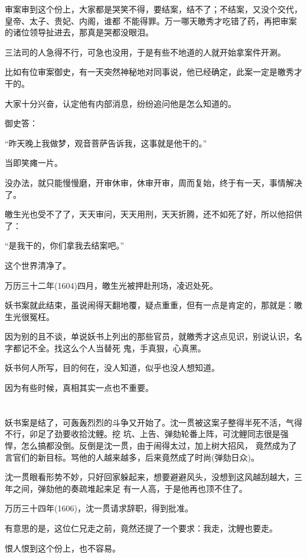 \documentclass[11pt,a4paper,onecolumn]{article}
\begin{document}
审案审到这个份上，大家都是哭笑不得，要结案，结不了；不结案，又没个交代，皇帝、太子、贵妃、内阁，谁都
不能得罪。万一哪天皦秀才吃错了药，再把审案的诸位领导扯进去，那真是哭都没眼泪。

三法司的人急得不行，可急也没用，于是有些不地道的人就开始拿案件开涮。

比如有位审案御史，有一天突然神秘地对同事说，他已经确定，此案一定是皦秀才干的。

大家十分兴奋，认定他有内部消息，纷纷追问他是怎么知道的。

御史答：

``昨天晚上我做梦，观音菩萨告诉我，这事就是他干的。''

当即笑瘫一片。

没办法，就只能慢慢磨，开审休审，休审开审，周而复始，终于有一天，事情解决了。

皦生光也受不了了，天天审问，天天用刑，天天折腾，还不如死了好，所以他招供了：

``是我干的，你们拿我去结案吧。''

这个世界清净了。

万历三十二年(1604)四月，皦生光被押赴刑场，凌迟处死。

妖书案就此结束，虽说闹得天翻地覆，疑点重重，但有一点是肯定的，那就是：皦生光很冤枉。

因为别的且不谈，单说妖书上列出的那些官员，就皦秀才这点见识，别说认识，名字都记不全。找这么个人当替死
鬼，手真狠，心真黑。

妖书何人所写，目的何在，没人知道，似乎也没人想知道。

因为有些时候，真相其实一点也不重要。

\section[\thesection]{}

妖书案是结了，可轰轰烈烈的斗争又开始了。沈一贯被这案子整得半死不活，气得不行，卯足了劲要收拾沈鲤。挖
坑、上告、弹劾轮番上阵，可沈鲤同志很是强悍，怎么搞都没倒。反倒是沈一贯，由于闹得太过，加上树大招风，
竟然成为了言官们的新目标。骂他的人越来越多，后来竟然成了时尚(弹劾日众)。

沈一贯眼看形势不妙，只好回家躲起来，想要避避风头，没想到这风越刮越大，三年之间，弹劾他的奏疏堆起来足
有一人高，于是他再也顶不住了。

万历三十四年(1606)，沈一贯请求辞职，得到批准。

有意思的是，这位仁兄走之前，竟然还提了一个要求：我走，沈鲤也要走。

恨人恨到这个份上，也不容易。
\end{document}
